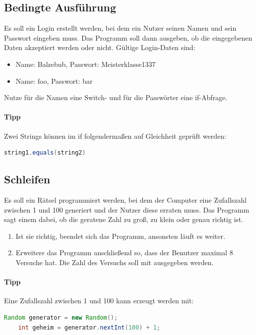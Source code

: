 \documentclass[11pt, a4paper]{article}
\begin{document}
\subsection{Bedingte Ausführung}
Es soll ein Login erstellt werden, bei dem ein Nutzer seinen Namen und sein Passwort eingeben muss. Das Programm soll dann ausgeben, ob die eingegebenen Daten akzeptiert werden oder nicht. Gültige Login-Daten sind:
\begin{itemize}
	\item Name: Balzebub, Passwort: Meisterklasse1337
	\item Name: foo, Passwort: bar
\end{itemize}
Nutze für die Namen eine Switch- und für die Passwörter eine if-Abfrage.
\paragraph{Tipp} Zwei Strings können im if folgendermaßen auf Gleichheit geprüft werden:
\begin{lstlisting}[language=Java]
	string1.equals(string2)
\end{lstlisting}



\subsection{Schleifen}
Es soll ein Rätsel programmiert werden, bei dem der Computer eine Zufallszahl zwischen 1 und 100 generiert und der Nutzer diese erraten muss. Das Programm sagt einem dabei, ob die geratene Zahl zu groß, zu klein oder genau richtig ist.
\begin{enumerate}
	\item Ist sie richtig, beendet sich das Programm, ansonsten läuft es weiter.
	\item Erweitere das Programm anschließend so, dass der Benutzer maximal 8 Versuche hat. Die Zahl des Versuchs soll mit ausgegeben werden.
\end{enumerate}
\paragraph{Tipp} Eine Zufallszahl zwischen 1 und 100 kann erzeugt werden mit:
\begin{lstlisting}[language=Java]
	Random generator = new Random();
	int geheim = generator.nextInt(100) + 1;
\end{lstlisting}
\end{document}
